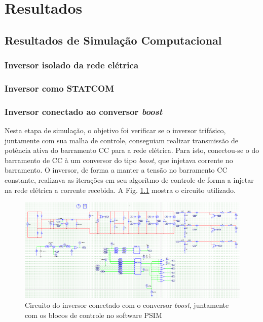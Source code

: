 \chapter{Resultados}

\section{Resultados de Simulação Computacional}

\subsection{Inversor isolado da rede elétrica}

\subsection{Inversor como STATCOM}

\subsection{Inversor conectado ao conversor \textit{boost}}

Nesta etapa de simulação, o objetivo foi verificar se o inversor trifásico, juntamente com sua malha de controle, conseguiam realizar transmissão de potência ativa do barramento CC para a rede elétrica. 
Para isto, conectou-se o do barramento de CC à um conversor do tipo \textit{boost}, que injetava corrente no barramento.
O inversor, de forma a manter a tensão no barramento CC constante, realizava as iterações em seu algorítmo de controle de forma a injetar na rede elétrica a corrente recebida.
A Fig. \ref{fig:sim-circuito-inversor-boost} mostra o circuito utilizado.

\begin{figure}[!hbt]
	\begin{center}
    \includegraphics[width=\textwidth]{figuras/sim_figures/sistema_completo/montagem/sistema_completo.PNG}    \centering
    \caption{Circuito do inversor conectado com o conversor \textit{boost}, juntamente com os blocos de controle no software PSIM}
    \label{fig:sim-circuito-inversor-boost}
    \end{center}
\end{figure}

